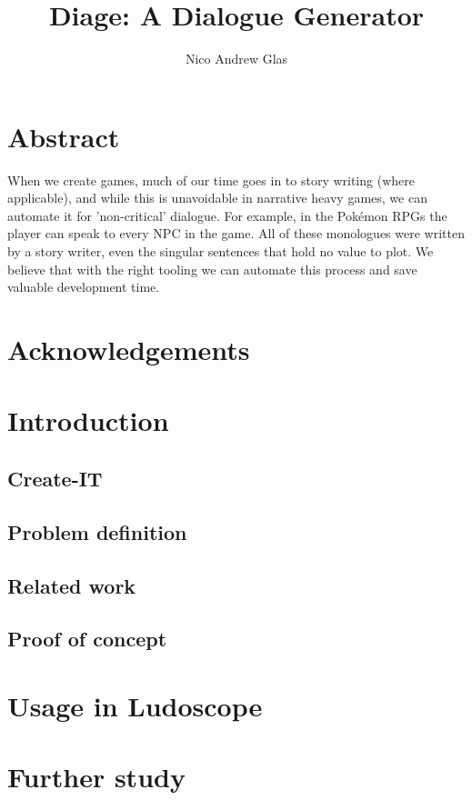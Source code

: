 \documentclass[11pt,a4paper,onecolumn,titlepage]{book}
\author{Nico Andrew Glas}
\title{Diage: A Dialogue Generator}
\begin{document}
\maketitle
\chapter*{Abstract}
When we create games, much of our time goes in to story writing (where applicable), and while this is unavoidable in narrative heavy games, we can automate it for 'non-critical' dialogue. For example, in the Pokémon RPGs the player can speak to every NPC in the game. All of these monologues were written by a story writer, even the singular sentences that hold no value to plot. We believe that with the right tooling we can automate this process and save valuable development time. \cite{Cavazza:2002:CIS:630325.630747} \cite{Greimas:Boydstun:90} \cite{Magerko:2004:ACD:1597321.1597339} \cite{Porteous:2009:CNG:1695522.1695557} \cite{Weyhrauch:1997:GID:925491} \cite{Riedl03character-focusednarrative} \cite{Riedl:2003:MIU:860575.860694} \cite{Riedl:2004:IPM:1018409.1018753} \cite{Sgouros199929}

\chapter*{Acknowledgements}

\newpage
\tableofcontents
\newpage
\chapter{Introduction}

\section{Create-IT}

\section{Problem definition}

\section{Related work}

\section{Proof of concept}


\chapter{Usage in Ludoscope}
\chapter{Further study}
\label{sec:further_study}


\end{document}
